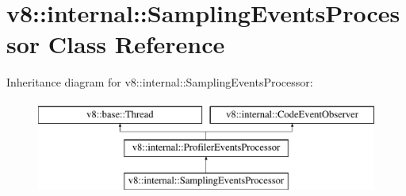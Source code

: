 \hypertarget{classv8_1_1internal_1_1SamplingEventsProcessor}{}\section{v8\+:\+:internal\+:\+:Sampling\+Events\+Processor Class Reference}
\label{classv8_1_1internal_1_1SamplingEventsProcessor}
Inheritance diagram for v8\+:\+:internal\+:\+:Sampling\+Events\+Processor\+:\begin{figure}[H]
\begin{center}
\leavevmode
\includegraphics[height=3.000000cm]{classv8_1_1internal_1_1SamplingEventsProcessor}
\end{center}
\end{figure}
